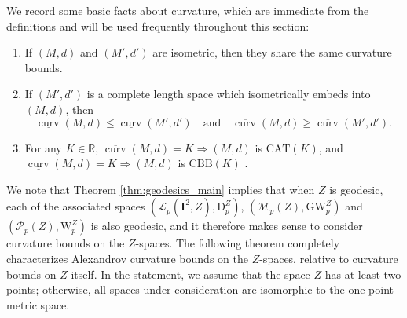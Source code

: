 \documentclass{article}
\theoremstyle{definition}
\newcommand{\M}{\mathcal{M}}
\newcommand{\MZp}{\M_p(Z)}
\newcommand{\dgwz}{\mathrm{GW}_p^Z}
\newcommand{\WZ}{\mathcal{P}_p(Z)}
\newcommand{\wz}{\mathrm{W}_p^Z}
\newcommand{\Lp}{\mathcal{L}_p}
\newcommand{\dpz}{\mathrm{D}^Z_p}
\newcommand{\curv}{\underline{\operatorname{curv}}}
\newcommand{\curvupper}{\overline{\operatorname{curv}}}
\begin{document}
We record some basic facts about curvature, which are immediate from the definitions and will be used frequently throughout this section:
\begin{enumerate}[label=(\arabic*)]
    \item If $(M,d)$ and $(M',d')$ are isometric, then they share the same curvature bounds.
    \item If $(M',d')$ is a complete length space which isometrically embeds into $(M,d)$, then
    \[
    \curv(M,d) \leq \curv(M',d') \quad \mbox{and} \quad \curvupper(M,d) \geq \curvupper(M',d').
    \]
    \item For any $K\in \mathbb{R}$, $\curvupper(M,d)=K \Rightarrow (M,d)$ is $\mathrm{CAT}(K)$, and $\curv(M,d)=K \Rightarrow (M,d)$ is $\mathrm{CBB}(K)$ \cite[Proposition 8.4 and 9.7]{alexander2024alexandrov}. 
\end{enumerate}


We note that Theorem \ref{thm:geodesics_main} implies that when $Z$ is geodesic,   each of the associated spaces $(\Lp(\mathbf{I}^2,Z),\dpz)$, 
$(\MZp, \dgwz)$ and 
$(\WZ,\wz)$ is also geodesic, and it therefore makes sense to consider curvature bounds on the $Z$-spaces. The following theorem completely characterizes Alexandrov curvature bounds on the $Z$-spaces, relative to curvature bounds on $Z$ itself. In the statement, we assume that the space $Z$ has at least two points; otherwise, all spaces under consideration are isomorphic to the one-point metric space. 
\end{document}
